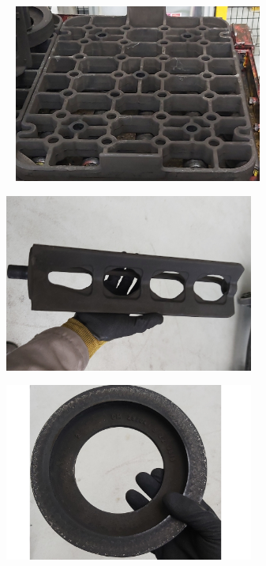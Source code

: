 \begin{figure}[htb]
    \centering
    \begin{subfigure}{.33\textwidth}\
        \centering
        \includegraphics[width = 0.9\textwidth]{Figures/Cap3/Prato.png}
        \caption{}
        \label{fig:Prato}
    \end{subfigure}%
    \centering
    \begin{subfigure}{.33\textwidth}
        \centering
        \includegraphics[width = 0.9\textwidth]{Figures/Cap3/Torre.png}
        \caption{}
        \label{fig:Torre}
    \end{subfigure}
    \centering
    \begin{subfigure}{.33\textwidth}
        \centering
        \includegraphics[width = 0.9\textwidth]{Figures/Cap3/Falsa_coroa.png}

\end{subfigure}
\end{figure}
